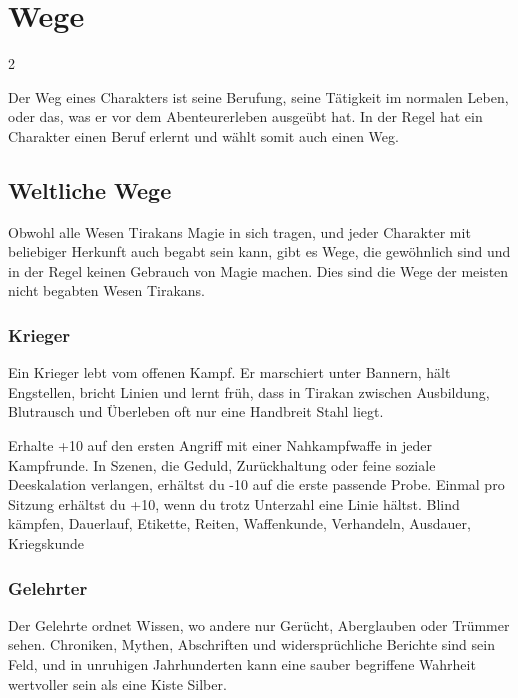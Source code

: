 \section{Wege}\label{sec:wege}

{
    \begin{multicols*}{2}

        Der Weg eines Charakters ist seine Berufung, seine Tätigkeit im normalen Leben, oder das, was er vor dem Abenteurerleben ausgeübt hat. In der Regel hat ein Charakter einen Beruf erlernt und wählt somit auch einen Weg.

        \subsection{Weltliche Wege}\label{subsec:wege-weltlich}

        Obwohl alle Wesen Tirakans Magie in sich tragen, und jeder Charakter mit beliebiger Herkunft auch begabt sein kann, gibt es Wege, die gewöhnlich sind und in der Regel keinen Gebrauch von Magie machen. Dies sind die Wege der meisten nicht begabten Wesen Tirakans.

        \subsubsection*{Krieger}
        Ein Krieger lebt vom offenen Kampf. Er marschiert unter Bannern, hält Engstellen, bricht Linien und lernt früh, dass in Tirakan zwischen Ausbildung, Blutrausch und Überleben oft nur eine Handbreit Stahl liegt.

        \wegespielwertebox
        {Erhalte +10 auf den ersten Angriff mit einer Nahkampfwaffe in jeder Kampfrunde.}
        {In Szenen, die Geduld, Zurückhaltung oder feine soziale Deeskalation verlangen, erhältst du -10 auf die erste passende Probe.}
        {Einmal pro Sitzung erhältst du +10, wenn du trotz Unterzahl eine Linie hältst.}
        {Blind kämpfen, Dauerlauf, Etikette, Reiten, Waffenkunde, Verhandeln, Ausdauer, Kriegskunde}

        \subsubsection*{Gelehrter}
        Der Gelehrte ordnet Wissen, wo andere nur Gerücht, Aberglauben oder Trümmer sehen. Chroniken, Mythen, Abschriften und widersprüchliche Berichte sind sein Feld, und in unruhigen Jahrhunderten kann eine sauber begriffene Wahrheit wertvoller sein als eine Kiste Silber.


\end{multicols*}}
